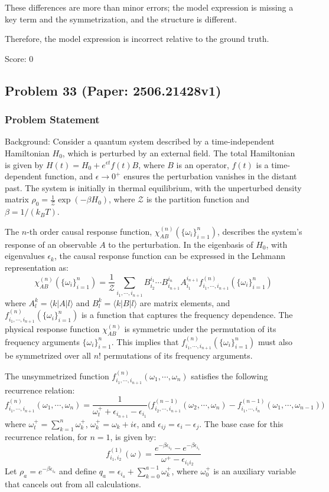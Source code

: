 \documentclass[10pt]{article}
\begin{document}
These differences are more than minor errors; the model expression is missing a key term and the symmetrization, and the structure is different.

Therefore, the model expression is incorrect relative to the ground truth.

Score: 0

\newpage
\subsection*{Problem 33 (Paper: 2506.21428v1)}
\subsubsection*{Problem Statement}
Background:
Consider a quantum system described by a time-independent Hamiltonian $H_0$, which is perturbed by an external field. The total Hamiltonian is given by $H(t) = H_0 + e^{\epsilon t}f(t)B$, where $B$ is an operator, $f(t)$ is a time-dependent function, and $\epsilon \rightarrow 0^+$ ensures the perturbation vanishes in the distant past. The system is initially in thermal equilibrium, with the unperturbed density matrix $\rho_0 = \frac{1}{\mathcal{Z}}\exp(-\beta H_0)$, where $\mathcal{Z}$ is the partition function and $\beta = 1/(k_B T)$.

The $n$-th order causal response function, $\chi^{(n)}_{AB}(\{\omega_i\}_{i=1}^n)$, describes the system's response of an observable $A$ to the perturbation. In the eigenbasis of $H_0$, with eigenvalues $\epsilon_k$, the causal response function can be expressed in the Lehmann representation as:
$$ \chi^{(n)}_{AB}(\{\omega_i\}_{i=1}^n)=\frac{1}{\mathcal{Z}}\sum_{i_1,\cdots,i_{n+1}}B^{i_1}_{i_2}\cdots B^{i_n}_{i_{n+1}}A^{i_{n+1}}_{i_1}f^{(n)}_{i_1,\cdots,i_{n+1}}(\{\omega_i\}_{i=1}^n) $$
where $A^k_l = \langle k|A|l\rangle$ and $B^k_l = \langle k|B|l\rangle$ are matrix elements, and $f^{(n)}_{i_1,\cdots,i_{n+1}}(\{\omega_i\}_{i=1}^n)$ is a function that captures the frequency dependence. The physical response function $\chi^{(n)}_{AB}$ is symmetric under the permutation of its frequency arguments $\{\omega_i\}_{i=1}^n$. This implies that $f^{(n)}_{i_1,\cdots,i_{n+1}}(\{\omega_i\}_{i=1}^n)$ must also be symmetrized over all $n!$ permutations of its frequency arguments.

The unsymmetrized function $f^{(n)}_{i_1,\cdots,i_{n+1}}(\omega_1,\cdots,\omega_n)$ satisfies the following recurrence relation:
$$ f^{(n)}_{i_1,\cdots,i_{n+1}}(\omega_1,\cdots,\omega_n)=\frac{1}{\omega^+_t+\epsilon_{i_{n+1}}-\epsilon_{i_1}}\Big(f^{(n-1)}_{i_2,\cdots,i_{n+1}}(\omega_2,\cdots,\omega_{n})-f^{(n-1)}_{i_1,\cdots,i_{n}}(\omega_1,\cdots,\omega_{n-1})\Big) $$
where $\omega_t^+ = \sum_{k=1}^n \omega_k^+$, $\omega_k^+ = \omega_k + i\epsilon$, and $\epsilon_{ij} = \epsilon_i - \epsilon_j$.
The base case for this recurrence relation, for $n=1$, is given by:
$$ f^{(1)}_{i_1,i_2}(\omega)=\frac{e^{-\beta\epsilon_{i_2}}-e^{-\beta\epsilon_{i_1}}}{\omega^+-\epsilon_{i_1i_2}} $$
Let $\rho_a = e^{-\beta\epsilon_{i_a}}$ and define $q_a = \epsilon_{i_a} + \sum_{k=0}^{a-1}\omega_k^+$, where $\omega_0^+$ is an auxiliary variable that cancels out from all calculations.
\end{document}

